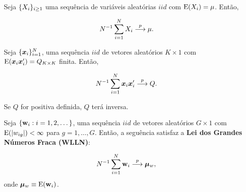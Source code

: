 \documentclass[11pt, oneside, a4paper, article]{article}
\numberwithin{equation}{section}
\begin{document}
\begin{description}
\begin{teo}
	Seja $\{X_{i}\}_{i \geq 1}$ uma sequência de variáveis aleatórias $iid$ com $\text{E}(X_{i}) = \mu$.
	Então, 

	\vspace{-1 em}
	\begin{align*}
		N^{-1} \sum_{i=1}^{N} X_{i}  \overset{p}{\longrightarrow}  \mu.
	\end{align*}
\end{teo}

\begin{teo} \label{teo:lgn:mat:1}

	Seja $\{\boldsymbol{x}_{i}\}_{i=1}^{N}$, uma sequência $iid$ de vetores aleatórios $K \times 1$ com $\text{E}(\boldsymbol{x}_{i} \boldsymbol{x}_{i}') = Q_{K \times K}$ finita.
	Então, 

	\vspace{-1 em}
	\begin{align*}
		N^{-1} \sum_{i=1}^{N}
		\boldsymbol{x}_{i} \boldsymbol{x}_{i}'
		 \overset{p}{\longrightarrow}  Q.
	\end{align*}

	Se $Q$ for positiva definida, $Q$ terá inversa.
\end{teo}

\begin{teo} \label{teo:lgn:mat}
	\citet[Teo 3.1, p.39 ]{wool-2010}

	Seja $\{\mathbf{w}_{i} : i=1,2, \dots\}$, uma sequência $iid$ de vetores aleatórios $G \times 1$ com
	$\text{E}(|w_{ig}|) < \infty$ para $g = 1, \dots, G$.
	Então, a seguência satisfaz a \textbf{Lei dos Grandes Números Fraca (WLLN)}:

	\vspace{-1 em}
	\begin{align*}
		N^{-1} \sum_{i=1}^{N}
		\mathbf{w}_{i}  \overset{p}{\longrightarrow}  \boldsymbol{\mu}_{w},
	\end{align*}
	onde $\boldsymbol{\mu}_{w} \equiv \text{E}(\mathbf{w}_{i})$.
\end{teo}

\begin{defn}[$\litop$]
\item
	\citet[Def 3.4, p.36 ]{wool-2010}\\
	\citet[Lemma 3.2, p.36 ]{wool-2010}


\end{defn}
\end{description}
\end{document}
